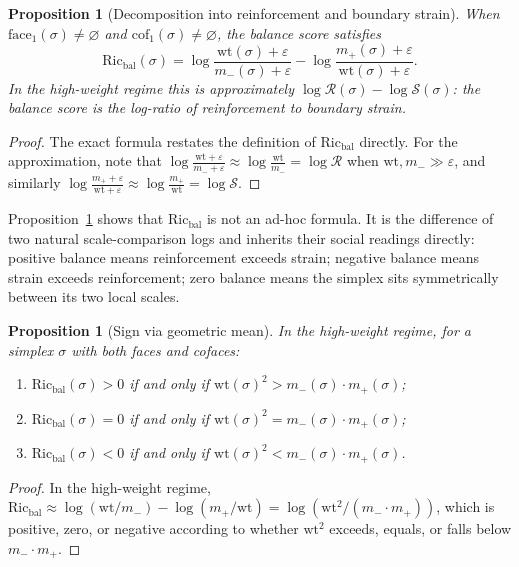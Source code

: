 \documentclass[11pt]{article}
\newtheorem{proposition}[definition]{Proposition}
\newcommand{\eps}{\varepsilon}
\newcommand{\wt}{\mathrm{wt}}
\newcommand{\Ric}{\mathrm{Ric}}
\newcommand{\cof}{\mathrm{cof}}
\newcommand{\face}{\mathrm{face}}
\begin{document}
\begin{proposition}[Decomposition into reinforcement and boundary strain]
\label{prop:decomp}
When $\face_1(\sigma)\neq\varnothing$ and $\cof_1(\sigma)\neq\varnothing$, the balance score satisfies
\[
\Ric_{\mathrm{bal}}(\sigma)
= \log\frac{\wt(\sigma)+\eps}{m_-(\sigma)+\eps}
- \log\frac{m_+(\sigma)+\eps}{\wt(\sigma)+\eps}.
\]
In the high-weight regime this is approximately $\log\mathcal{R}(\sigma)-\log\mathcal{S}(\sigma)$: the balance score is the log-ratio of reinforcement to boundary strain.
\end{proposition}

\begin{proof}
The exact formula restates the definition of $\Ric_{\mathrm{bal}}$ directly. For the approximation, note that
$\log\frac{\wt+\eps}{m_-+\eps}\approx\log\frac{\wt}{m_-}=\log\mathcal{R}$
when $\wt,m_-\gg\eps$, and similarly
$\log\frac{m_++\eps}{\wt+\eps}\approx\log\frac{m_+}{\wt}=\log\mathcal{S}$.
\end{proof}

Proposition~\ref{prop:decomp} shows that $\Ric_{\mathrm{bal}}$ is not an ad-hoc formula. It is the difference of two natural scale-comparison logs and inherits their social readings directly: positive balance means reinforcement exceeds strain; negative balance means strain exceeds reinforcement; zero balance means the simplex sits symmetrically between its two local scales.

\begin{proposition}[Sign via geometric mean]
\label{prop:sign}
In the high-weight regime, for a simplex $\sigma$ with both faces and cofaces:
\begin{enumerate}[label=(\roman*)]
  \item $\Ric_{\mathrm{bal}}(\sigma)>0$ if and only if $\wt(\sigma)^2>m_-(\sigma)\cdot m_+(\sigma)$;
  \item $\Ric_{\mathrm{bal}}(\sigma)=0$ if and only if $\wt(\sigma)^2=m_-(\sigma)\cdot m_+(\sigma)$;
  \item $\Ric_{\mathrm{bal}}(\sigma)<0$ if and only if $\wt(\sigma)^2<m_-(\sigma)\cdot m_+(\sigma)$.
\end{enumerate}
\end{proposition}

\begin{proof}
In the high-weight regime, $\Ric_{\mathrm{bal}}\approx\log(\wt/m_-)-\log(m_+/\wt)=\log(\wt^2/(m_-\cdot m_+))$, which is positive, zero, or negative according to whether $\wt^2$ exceeds, equals, or falls below $m_-\cdot m_+$.
\end{proof}
\end{document}
